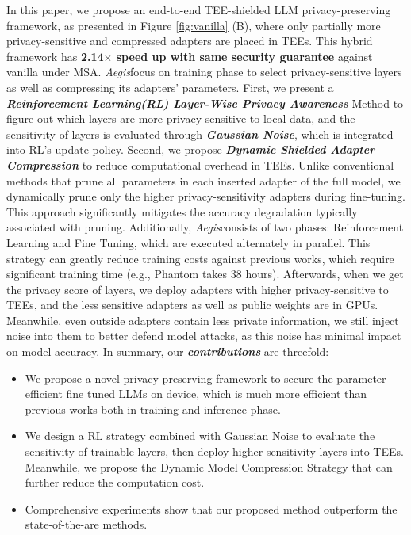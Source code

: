 \documentclass{article}
\newcommand{\method}{\textit{Aegis}}
\begin{document}
In this paper, we propose an end-to-end TEE-shielded LLM privacy-preserving framework, as presented in Figure \ref{fig:vanilla} (B), where only partially more privacy-sensitive and compressed adapters are placed in TEEs. This hybrid framework has \textbf{2.14$\times$ speed up with same security guarantee} against vanilla under MSA. \method focus on training phase to select privacy-sensitive layers as well as compressing its adapters' parameters. First, we present a \textbf{\textit{Reinforcement Learning(RL) Layer-Wise Privacy Awareness}} Method to figure out which layers are more privacy-sensitive to local data, and the sensitivity of layers is evaluated through \textbf{\textit{Gaussian Noise}}\cite{adamczewski2023differential_privacy}, which is integrated into RL's update policy. Second, we propose \textbf{\textit{Dynamic Shielded Adapter Compression}} to reduce computational overhead in TEEs. Unlike conventional methods that prune all parameters in each inserted adapter of the full model, we dynamically prune only the higher privacy-sensitivity adapters during fine-tuning. This approach significantly mitigates the accuracy degradation typically associated with pruning. Additionally, \method consists of two phases: Reinforcement Learning and Fine Tuning, which are executed alternately in parallel. This strategy can greatly reduce training costs against previous works\cite{zhang2024no,AnonymousCoder2025Phantom}, which require significant training time (e.g., Phantom takes 38 hours). Afterwards, when we get the privacy score of layers, we deploy adapters with higher privacy-sensitive to TEEs, and the less sensitive adapters as well as public weights are in GPUs. Meanwhile, even outside adapters contain less private information, we still inject noise into them to better defend model attacks, as this noise has minimal impact on model accuracy. In summary, our \textbf{\textit{contributions}} are threefold:

\begin{itemize}
    \setlength{\itemsep}{2pt}
    \item We propose a novel privacy-preserving framework to secure the parameter efficient fine tuned LLMs on device, which is much more efficient than previous works both in training and inference phase.
    \item We design a RL strategy combined with Gaussian Noise to evaluate the sensitivity of trainable layers, then deploy higher sensitivity layers into TEEs. Meanwhile, we propose the Dynamic Model Compression Strategy that can further reduce the computation cost.
    \item Comprehensive experiments show that our proposed method outperform the state-of-the-are methods.
\end{itemize}
\end{document}
